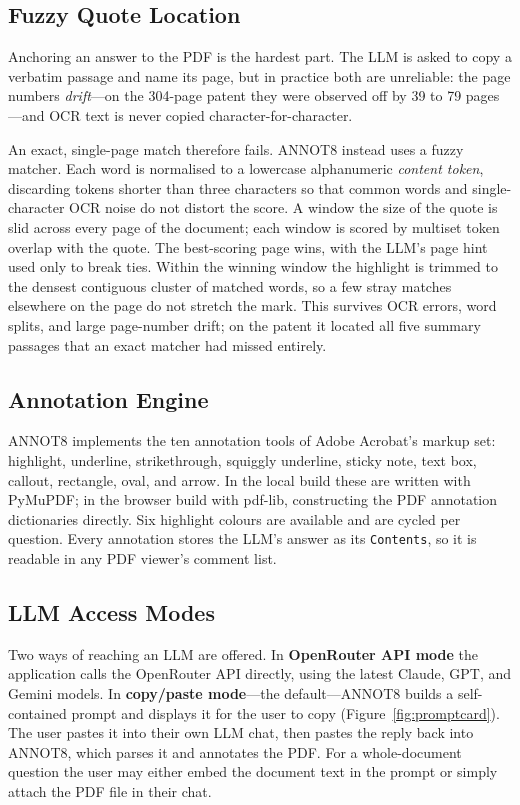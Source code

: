 \documentclass[11pt]{article}
\begin{document}
\subsection{Fuzzy Quote Location}

Anchoring an answer to the PDF is the hardest part. The LLM is asked to copy a
verbatim passage and name its page, but in practice both are unreliable: the
page numbers \emph{drift}---on the 304-page patent they were observed off by 39
to 79 pages---and OCR text is never copied character-for-character.

An exact, single-page match therefore fails. ANNOT8 instead uses a fuzzy
matcher. Each word is normalised to a lowercase alphanumeric \emph{content
token}, discarding tokens shorter than three characters so that common words
and single-character OCR noise do not distort the score. A window the size of
the quote is slid across every page of the document; each window is scored by
multiset token overlap with the quote. The best-scoring page wins, with the
LLM's page hint used only to break ties. Within the winning window the
highlight is trimmed to the densest contiguous cluster of matched words, so a
few stray matches elsewhere on the page do not stretch the mark. This survives
OCR errors, word splits, and large page-number drift; on the patent it located
all five summary passages that an exact matcher had missed entirely.

\subsection{Annotation Engine}

ANNOT8 implements the ten annotation tools of Adobe Acrobat's markup set:
highlight, underline, strikethrough, squiggly underline, sticky note, text
box, callout, rectangle, oval, and arrow. In the local build these are written
with PyMuPDF; in the browser build with pdf-lib, constructing the PDF
annotation dictionaries directly. Six highlight colours are available and are
cycled per question. Every annotation stores the LLM's answer as its
\texttt{Contents}, so it is readable in any PDF viewer's comment list.

\subsection{LLM Access Modes}

Two ways of reaching an LLM are offered. In \textbf{OpenRouter API mode} the
application calls the OpenRouter API directly, using the latest Claude, GPT,
and Gemini models. In \textbf{copy/paste mode}---the default---ANNOT8 builds a
self-contained prompt and displays it for the user to copy
(Figure~\ref{fig:promptcard}). The user pastes it into their own LLM chat,
then pastes the reply back into ANNOT8, which parses it and annotates the PDF.
For a whole-document question the user may either embed the document text in
the prompt or simply attach the PDF file in their chat.
\end{document}

